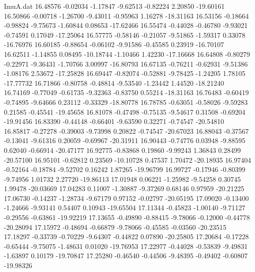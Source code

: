 \begin{filecontents}{ImuA.dat}
  16.48576   -0.02034   -1.17847   -9.62513   -0.82224    2.20850  -19.60161
  16.50866   -0.00718   -1.26700   -9.43011   -0.95963    1.16278  -18.31163
  16.53156   -0.18664   -0.98824   -9.75673   -1.60844    0.08653  -17.62466
  16.55474   -0.44028   -0.46780   -9.93021   -0.74591    0.17049  -17.25064
  16.57775   -0.58146   -0.21057   -9.51865   -1.59317    0.33078  -16.76976
  16.60185   -0.88654   -0.06102   -9.91586   -0.45585    0.23919  -16.70107
  16.62511   -1.14855    0.08495  -10.18744   -1.10466    1.42230  -17.16668
  16.64808   -0.80279   -0.22971   -9.36431   -1.70766    3.00997  -16.80793
  16.67135   -0.76211   -0.62931   -9.51386   -1.08176    2.53672  -17.25828
  16.69447   -0.82074   -0.52881   -9.78425   -1.24205    1.78105  -17.77732
  16.71866   -0.80758   -0.48814   -9.53540   -1.23442    1.44520  -18.21240
  16.74169   -0.77049   -0.61735   -9.32363   -0.83750    0.55214  -18.31163
  16.76483   -0.60419   -0.74895   -9.64666    0.23112   -0.33329  -18.80778
  16.78785   -0.63051   -0.58026   -9.59283    0.21585   -0.45541  -19.45658
  16.81078   -0.47498   -0.75135   -9.54617    0.31508   -0.69204  -19.91456
  16.83390   -0.44148   -0.66401   -9.63590    0.32271   -0.74547  -20.54810
  16.85817   -0.27278   -0.39003   -9.73998    0.20822   -0.74547  -20.67023
  16.88043   -0.37567   -0.13041   -9.61316    0.20059   -0.69967  -20.31911
  16.90443   -0.74776    0.03948   -9.88595    0.62040   -0.66914  -20.47177
  16.92775   -0.83868    0.19860   -9.99243    1.36843    0.28499  -20.57100
  16.95101   -0.62812    0.23569  -10.10728    0.47537    1.70472  -20.18935
  16.97404   -0.52164   -0.18784   -9.52702    0.16242    1.87265  -19.96799
  16.99727   -0.17946   -0.80399   -9.74956    1.01732    2.27720  -19.86113
  17.01948    0.06221   -1.25982   -9.54258    0.30745    1.99478  -20.03669
  17.04283    0.11007   -1.30887   -9.37269    0.68146    0.97959  -20.21225
  17.06730   -0.14237   -1.28734   -9.67179    0.97152   -0.02797  -20.05195
  17.09020   -0.13400   -1.24666   -9.93141    0.54407    0.10943  -19.65504
  17.11344   -0.45823   -1.00140   -9.71127   -0.29556   -0.63861  -19.92219
  17.13655   -0.49890   -0.88415   -9.78066   -0.12000   -0.44778  -20.28094
  17.15972   -0.48694   -0.66879   -9.78066   -0.45585   -0.03560  -20.23515
  17.18297   -0.33739   -0.70229   -9.64307   -0.44822    0.07890  -20.25805
  17.20684   -0.17228   -0.65444   -9.75075   -1.48631    0.01020  -19.76953
  17.22977   -0.44028   -0.53839   -9.49831   -1.63897    0.10179  -19.70847
  17.25280   -0.46540   -0.44506   -9.48395   -0.49402   -0.60807  -19.98326

\end{filecontents}
